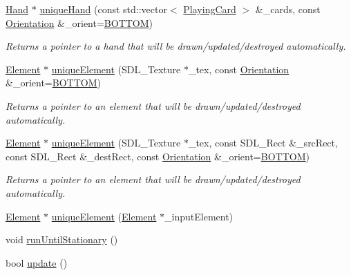\begin{DoxyCompactItemize}
\hyperlink{classGUI_1_1Hand}{Hand} $\ast$ \hyperlink{classGUI_1_1DealerGUI_a1b05cdea047b2dc8c8a15156ea168159}{unique\-Hand} (const std\-::vector$<$ \hyperlink{classPlayingCard}{Playing\-Card} $>$ \&\-\_\-cards, const \hyperlink{namespaceGUI_a1a3a8094d47f7be06ce123fab38abf6a}{Orientation} \&\-\_\-orient=\hyperlink{namespaceGUI_a1a3a8094d47f7be06ce123fab38abf6aafb2c9cf323a63df7a7ac4ade2e4e63e5}{B\-O\-T\-T\-O\-M})
\begin{DoxyCompactList}\small\item\em Returns a pointer to a hand that will be drawn/updated/destroyed automatically. \end{DoxyCompactList}\item 
\hyperlink{classGUI_1_1Element}{Element} $\ast$ \hyperlink{classGUI_1_1DealerGUI_a56ad9cac2f249bd46c733451d336f61d}{unique\-Element} (S\-D\-L\-\_\-\-Texture $\ast$\-\_\-tex, const \hyperlink{namespaceGUI_a1a3a8094d47f7be06ce123fab38abf6a}{Orientation} \&\-\_\-orient=\hyperlink{namespaceGUI_a1a3a8094d47f7be06ce123fab38abf6aafb2c9cf323a63df7a7ac4ade2e4e63e5}{B\-O\-T\-T\-O\-M})
\begin{DoxyCompactList}\small\item\em Returns a pointer to an element that will be drawn/updated/destroyed automatically. \end{DoxyCompactList}\item 
\hyperlink{classGUI_1_1Element}{Element} $\ast$ \hyperlink{classGUI_1_1DealerGUI_a360b7d38793512857999dd2c4fa7c61a}{unique\-Element} (S\-D\-L\-\_\-\-Texture $\ast$\-\_\-tex, const S\-D\-L\-\_\-\-Rect \&\-\_\-src\-Rect, const S\-D\-L\-\_\-\-Rect \&\-\_\-dest\-Rect, const \hyperlink{namespaceGUI_a1a3a8094d47f7be06ce123fab38abf6a}{Orientation} \&\-\_\-orient=\hyperlink{namespaceGUI_a1a3a8094d47f7be06ce123fab38abf6aafb2c9cf323a63df7a7ac4ade2e4e63e5}{B\-O\-T\-T\-O\-M})
\begin{DoxyCompactList}\small\item\em Returns a pointer to an element that will be drawn/updated/destroyed automatically. \end{DoxyCompactList}\item 
\hyperlink{classGUI_1_1Element}{Element} $\ast$ \hyperlink{classGUI_1_1DealerGUI_aba2e7ddc17133171cbbcfac1665ec94f}{unique\-Element} (\hyperlink{classGUI_1_1Element}{Element} $\ast$\-\_\-input\-Element)
\item 
void \hyperlink{classGUI_1_1DealerGUI_a1e05bdb4cc6037342614bff1a1e7cc6e}{run\-Until\-Stationary} ()
\item 
bool \hyperlink{classGUI_1_1DealerGUI_a479eecd663924d0616e516af9ca2679e}{update} ()

\end{DoxyCompactItemize}
